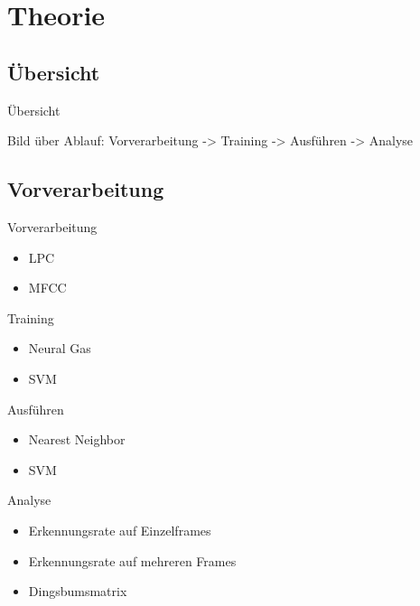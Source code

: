 \section{Theorie}

\subsection{Übersicht}
\begin{frame}{Übersicht}
	\begin{center}
		Bild über Ablauf: Vorverarbeitung -> Training -> Ausführen -> Analyse
	\end{center}
\end{frame}

\subsection{Vorverarbeitung}
\begin{frame}{Vorverarbeitung}
	\begin{itemize}[<+->]
		\item LPC
		\item MFCC
	\end{itemize}
\end{frame}

\begin{frame}{Training}
	\begin{itemize}[<+->]
		\item Neural Gas
		\item SVM
	\end{itemize}
\end{frame}

\begin{frame}{Ausführen}
	\begin{itemize}[<+->]
		\item Nearest Neighbor
		\item SVM
	\end{itemize}
\end{frame}

\begin{frame}{Analyse}
	\begin{itemize}[<+->]
		\item Erkennungsrate auf Einzelframes
		\item Erkennungsrate auf mehreren Frames
		\item Dingsbumsmatrix
	\end{itemize}
\end{frame}
